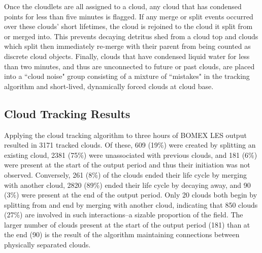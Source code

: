 \documentclass[acp]{copernicus}
\begin{document}
Once the cloudlets are all assigned to a cloud, any cloud that has condensed 
points for less than five minutes is flagged.  If any merge or split events 
occurred over these clouds' short lifetimes, the cloud is rejoined to the cloud 
it split from or merged into.  This prevents decaying detritus shed from a 
cloud top and clouds which split then immediately re-merge with their parent 
from being counted as discrete cloud objects.  Finally, clouds that have 
condensed liquid water for less than two minutes, and thus are unconnected to 
future or past clouds, are placed into a ``cloud noise" group consisting of a 
mixture of ``mistakes" in the tracking algorithm and short-lived, dynamically 
forced clouds at cloud base. 

\subsection{Cloud Tracking Results}

Applying the cloud tracking algorithm to three hours of BOMEX LES output 
resulted in 3171 tracked clouds.  Of these, 609 (19\%) were created by 
splitting an existing cloud, 2381 (75\%) were unassociated with previous 
clouds, and 181 (6\%) were present at the start of the output period and thus 
their initiation was not observed.  Conversely, 261 (8\%) of the clouds ended 
their life cycle by merging with another cloud, 2820 (89\%) ended their 
life cycle by decaying away, and 90 (3\%) were present at the end of the output 
period.  Only 20 clouds both begin by splitting from and end by merging with 
another cloud, indicating that 850 clouds (27\%) are involved in such 
interactions--a sizable proportion of the field.  The larger number of clouds 
present at the start of the output period (181) than at the end (90) is the 
result of the algorithm maintaining connections between physically separated 
clouds.
\end{document}
